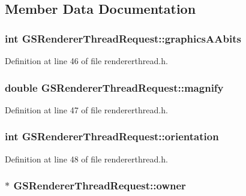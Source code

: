 \subsection{Member Data Documentation}
\hypertarget{structGSRendererThreadRequest_a8b8cba2c375cb6dd0c8ba24c5b7af6ec}{
\subsubsection[{graphics\+A\+Abits}]{\setlength{\rightskip}{0pt plus 5cm}int G\+S\+Renderer\+Thread\+Request\+::graphics\+A\+Abits}}\label{structGSRendererThreadRequest_a8b8cba2c375cb6dd0c8ba24c5b7af6ec}


Definition at line 46 of file rendererthread.\+h.

\hypertarget{structGSRendererThreadRequest_a1bf244d777a5ae497126ee81e6b25cbf}{
\subsubsection[{magnify}]{\setlength{\rightskip}{0pt plus 5cm}double G\+S\+Renderer\+Thread\+Request\+::magnify}}\label{structGSRendererThreadRequest_a1bf244d777a5ae497126ee81e6b25cbf}


Definition at line 47 of file rendererthread.\+h.

\hypertarget{structGSRendererThreadRequest_a1ba104a153a0665168543a77fdc5b061}{
\subsubsection[{orientation}]{\setlength{\rightskip}{0pt plus 5cm}int G\+S\+Renderer\+Thread\+Request\+::orientation}}\label{structGSRendererThreadRequest_a1ba104a153a0665168543a77fdc5b061}


Definition at line 48 of file rendererthread.\+h.

\hypertarget{structGSRendererThreadRequest_aec139828e53ddb30225c2581b1edd44a}{
\subsubsection[{owner}]{$\ast$ G\+S\+Renderer\+Thread\+Request\+::owner}}\label{structGSRendererThreadRequest_aec139828e53ddb30225c2581b1edd44a}



